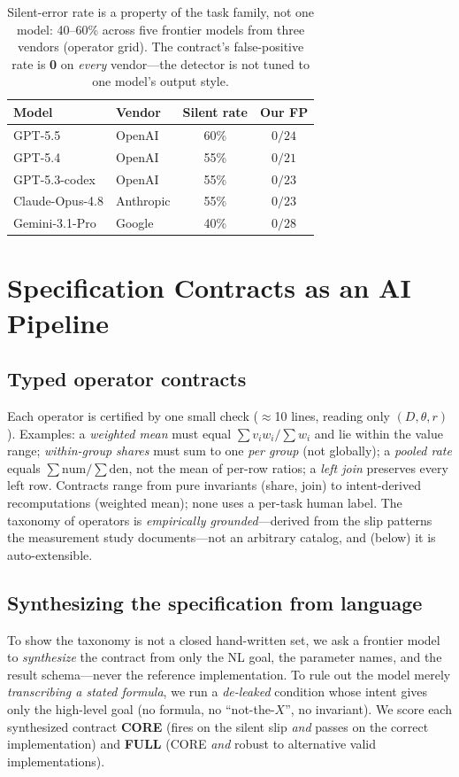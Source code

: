 \documentclass[10pt,twocolumn,letterpaper]{article}
\begin{document}
\begin{table}[t]\centering\small
\begin{tabular}{@{}llcc@{}}
\toprule
Model & Vendor & Silent rate & Our FP\\
\midrule
GPT-5.5 & OpenAI & 60\% & $0/24$\\
GPT-5.4 & OpenAI & 55\% & $0/21$\\
GPT-5.3-codex & OpenAI & 55\% & $0/23$\\
Claude-Opus-4.8 & Anthropic & 55\% & $0/23$\\
Gemini-3.1-Pro & Google & 40\% & $0/28$\\
\bottomrule
\end{tabular}
\caption{Silent-error rate is a property of the task family, not one model:
40--60\% across five frontier models from three vendors (operator grid). The
contract's false-positive rate is \textbf{0} on \emph{every} vendor---the
detector is not tuned to one model's output style.}
\label{tab:crossmodel}
\end{table}

\section{Specification Contracts as an AI Pipeline}\label{sec:method}
\subsection{Typed operator contracts}
Each operator is certified by one small check ($\approx$10 lines, reading only
$(D,\theta,r)$). Examples: a \emph{weighted mean} must equal $\sum v_iw_i/\sum
w_i$ and lie within the value range; \emph{within-group shares} must sum to one
\emph{per group} (not globally); a \emph{pooled rate} equals $\sum\text{num}/
\sum\text{den}$, not the mean of per-row ratios; a \emph{left join} preserves
every left row. Contracts range from pure invariants (share, join) to
intent-derived recomputations (weighted mean); none uses a per-task human label.
The taxonomy of operators is \emph{empirically grounded}---derived from the slip
patterns the measurement study documents---not an arbitrary catalog, and (below)
it is auto-extensible.

\subsection{Synthesizing the specification from language}\label{sec:m-synth}
To show the taxonomy is not a closed hand-written set, we ask a frontier model to
\emph{synthesize} the contract from only the NL goal, the parameter names, and
the result schema---never the reference implementation. To rule out the model
merely \emph{transcribing a stated formula}, we run a \emph{de-leaked} condition
whose intent gives only the high-level goal (no formula, no ``not-the-$X$'', no
invariant). We score each synthesized contract \textbf{CORE} (fires on the
silent slip \emph{and} passes on the correct implementation) and \textbf{FULL}
(CORE \emph{and} robust to alternative valid implementations).
\end{document}
